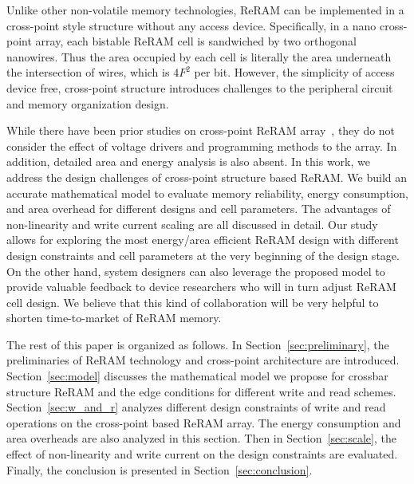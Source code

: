 Unlike other non-volatile memory technologies, ReRAM can be implemented in
a cross-point style structure without any access device. Specifically, in
a nano cross-point array, each bistable ReRAM cell is sandwiched by two
orthogonal nanowires. Thus the area occupied by
each cell is literally the area underneath the intersection of wires,
which is $4F^2$ per bit. However, the simplicity of access device free,
cross-point structure introduces challenges to the peripheral circuit and memory organization design.

While there have been prior studies on cross-point ReRAM
array~\cite{crossbar_NANO2002_Ziegler,crossbar_NANO08_Flocke,crossbar_TED_2010,crossbar_NANO2003_Ziegler},
they do not consider the effect of voltage drivers and programming methods
to the array. In addition, detailed area and energy analysis is also
absent. In this work, we address the design challenges of cross-point
structure based ReRAM. We build an accurate mathematical model to evaluate
memory reliability, energy consumption, and area overhead for different
designs and cell parameters. The advantages of non-linearity and write
current scaling are all discussed in detail. Our study allows for
exploring the most energy/area efficient ReRAM design with different
design constraints and cell parameters at the very beginning of the design
stage. On the other hand, system designers can also leverage the
proposed model to provide valuable feedback to device researchers who will
in turn adjust ReRAM cell design. We believe that this kind of
collaboration will be very helpful to shorten time-to-market of ReRAM
memory.

The rest of this paper is organized as follows. In
Section~\ref{sec:preliminary}, the preliminaries of ReRAM technology and
cross-point architecture are introduced. Section~\ref{sec:model} discusses
the mathematical model we propose for crossbar structure ReRAM and the
edge conditions for different write and read schemes.
Section~\ref{sec:w_and_r} analyzes different design constraints of write
and read operations on the cross-point based ReRAM array. The energy
consumption and area overheads are also analyzed in this section. Then in
Section~\ref{sec:scale}, the effect of non-linearity and write current on
the design constraints are evaluated. Finally, the conclusion is presented
in Section~\ref{sec:conclusion}.
